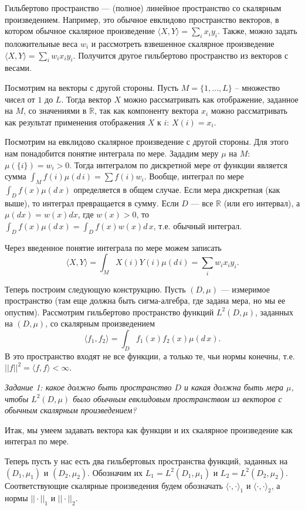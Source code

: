 \documentclass[12 pt]{article}
\begin{document}
Гильбертово пространство --- (полное) линейное пространство со скалярным произведением. Например, это обычное евклидово пространство векторов, в котором обычное скалярное произведение $\langle X,Y \rangle = \sum_i x_i y_i$. Также, можно задать положительные веса $w_i$ и рассмотреть взвешенное скалярное произведение $\langle X,Y \rangle = \sum_i w_i x_i y_i$. Получится другое гильбертово пространство из векторов с весами.

Посмотрим на векторы с другой стороны. Пусть $M=\{1,\ldots,L\}$ – множество чисел от $1$ до $L$. Тогда вектор $X$ можно рассматривать как отображение, заданное на $M$, со значениями в $\mathbb{R}$, так как компоненту вектора $x_i$ можно рассматривать как результат применения отображения $X$ к $i$: $X(i)=x_i$.

Посмотрим на евклидово скалярное произведение с другой стороны.
Для этого нам понадобится понятие интеграла по мере. Зададим меру $\mu$ на $M$: $\mu(\{i\}) = w_i>0$.
Тогда интегралом по дискретной мере от функции является сумма $\int_M f(i) \mu(d\,i)= \sum f(i) w_i$.
Вообще, интеграл по мере $\int_D f(x) \mu(d\,x)$ определяется в общем случае. Если мера дискретная (как выше), то
интеграл превращается в сумму. Если $D$ --- все $\mathbb{R}$ (или его интервал), а $\mu(dx) = w(x) dx$, где $w(x)>0$,
то $\int_D f(x) \mu(d\,x) = \int_D f(x) w(x) d\,x$, т.е. обычный интеграл.

Через введенное понятие интеграла по мере можем записать
$$\langle X,Y \rangle = \int_M X(i) Y(i) \mu(d\,i) = \sum_i w_i x_i y_i.$$

Теперь построим следующую конструкцию. Пусть $(D,\mu)$ --- измеримое пространство (там еще должна быть
сигма-алгебра, где задана мера, но мы ее опустим).
Рассмотрим гильбертово пространство функций $L^2(D,\mu)$, заданных на $(D,\mu)$, со скалярным произведением
$$\langle f_1,f_2 \rangle = \int_D f_1(x) f_2(x) \mu(d\,x).$$
В это пространство входят не все функции, а только те, чьи нормы конечны, т.е.
$||f||^2 = \langle f,f\rangle <\infty$.

\textit{Задание 1: какое должно быть пространство $D$ и какая должна быть мера $\mu$, чтобы $L^2(D,\mu)$
было обычным евклидовым пространством из векторов с обычным скалярным произведением?}

Итак, мы умеем задавать вектора как функции и их скалярное произведение как интеграл по мере.

Теперь пусть у нас есть два гильбертовых пространства функций, заданных на $(D_1,\mu_1)$ и
$(D_2,\mu_2)$. Обозначим их $L_1 = L^2(D_1,\mu_1)$ и  $L_2 = L^2(D_2,\mu_2)$.
Соответствующие скалярные произведения будем обозначать $\langle\cdot,\cdot\rangle_1$ и
$\langle\cdot,\cdot\rangle_2$, а нормы $||\cdot||_1$ и $||\cdot||_2$.
\end{document}
